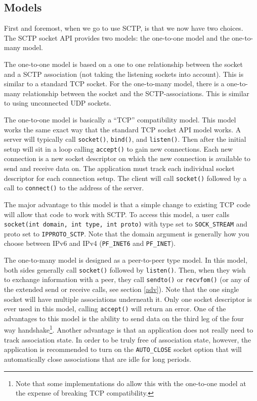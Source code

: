 \documentclass[conference]{IEEEtran}
\begin{document}
\subsection{Models}
First and foremost, when we go to use SCTP, is that we now have two choices.
The SCTP socket API provides two models: the one-to-one model and the
one-to-many model.

The one-to-one model is based on a one to one relationship between the socket and
a SCTP association (not taking the listening sockets into account). This is similar to
a standard TCP socket.
For the one-to-many model, there is a one-to-many relationship between the socket
and the SCTP-associations. This is similar to using unconnected UDP sockets.

The one-to-one model is basically a ``TCP'' compatibility model. This model
works the same exact way that the standard TCP socket API model works.
A server will typically call \texttt{socket()}, \texttt{bind()}, and \texttt{listen()}. Then after
the initial setup will sit in a loop calling \texttt{accept()} to gain new connections.
Each new connection is a new socket descriptor on which the new connection is
available to send and receive data on. The application must track each individual socket
descriptor for each connection setup.  The client will call \texttt{socket()} followed
by a call to \texttt{connect()} to the address of the server. 

The major advantage to this model is that a simple change to 
existing TCP code will allow that code to work with SCTP. To access this model, a user
calls \texttt{socket(int domain,  int type, int proto)}
with type set to \texttt{SOCK\_STREAM} and proto set to \texttt{IPPROTO\_SCTP}. 
Note that the domain argument is generally how you choose between IPv6 
and IPv4 (\texttt{PF\_INET6} and \texttt{PF\_INET}).

The one-to-many model is designed as a peer-to-peer type model.
In this model, both sides generally call \texttt{socket()} followed by \texttt {listen()}.
Then, when they wish to exchange information
with a peer, they call \texttt{sendto()} or \texttt{recvfom()} (or any of the extended send or
receive calls, see section \ref{adv}). Note that the one single socket will have multiple
associations underneath it. Only one socket descriptor is ever used
in this model, calling \texttt{accept()} will return an error.
One of the advantages to this model is the ability to send data on the third leg
of the four way handshake\footnote{Note that some implementations do allow this with
the one-to-one model at the expense of breaking TCP compatibility.}.
Another advantage is that an application does not really need to track association state.
In order to be truly free of association state, however, the application is recommended
to turn on the \texttt{AUTO\_CLOSE} socket option that will automatically close associations
that are idle for long periods. 
\end{document}
